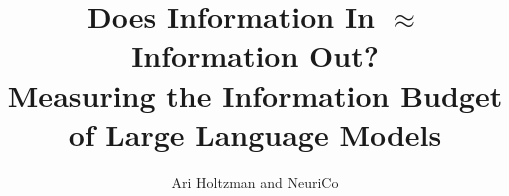 \documentclass{article}
\title{Does Information In $\approx$ Information Out? \\
Measuring the Information Budget of Large Language Models}
\author{Ari Holtzman and NeuriCo}
\begin{document}
\maketitle

\begin{abstract}

\end{abstract}










\end{document}

